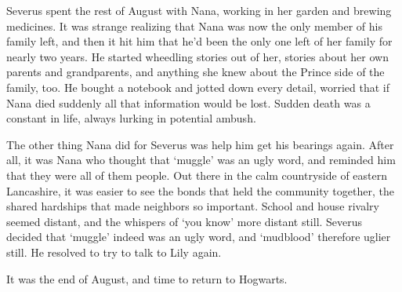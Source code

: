 Severus spent the rest of August with Nana, working in her garden and brewing medicines. It was strange realizing that Nana was now the only member of his family left, and then it hit him that he'd been the only one left of her family for nearly two years. He started wheedling stories out of her, stories about her own parents and grandparents, and anything she knew about the Prince side of the family, too. He bought a notebook and jotted down every detail, worried that if Nana died suddenly all that information would be lost. Sudden death was a constant in life, always lurking in potential ambush.

The other thing Nana did for Severus was help him get his bearings again. After all, it was Nana who thought that `muggle' was an ugly word, and reminded him that they were all of them people. Out there in the calm countryside of eastern Lancashire, it was easier to see the bonds that held the community together, the shared hardships that made neighbors so important. School and house rivalry seemed distant, and the whispers of `you know{\el}' more distant still. Severus decided that `muggle' indeed was an ugly word, and `mudblood' therefore uglier still. He resolved to try to talk to Lily again.

It was the end of August, and time to return to Hogwarts.


